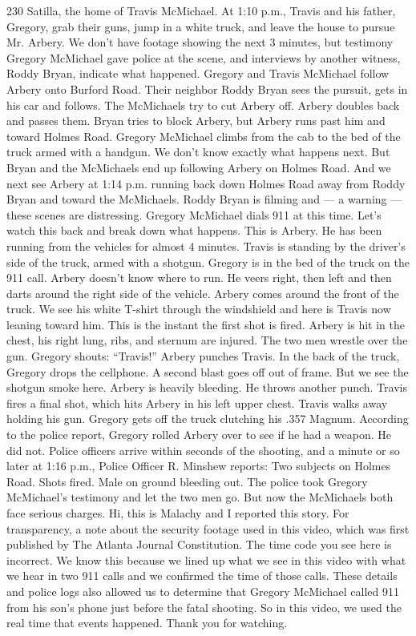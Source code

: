 \begin{itemize}
  230 Satilla, the home of Travis McMichael. At 1:10 p.m., Travis and
  his father, Gregory, grab their guns, jump in a white truck, and leave
  the house to pursue Mr. Arbery. We don't have footage showing the next
  3 minutes, but testimony Gregory McMichael gave police at the scene,
  and interviews by another witness, Roddy Bryan, indicate what
  happened. Gregory and Travis McMichael follow Arbery onto Burford
  Road. Their neighbor Roddy Bryan sees the pursuit, gets in his car and
  follows. The McMichaels try to cut Arbery off. Arbery doubles back and
  passes them. Bryan tries to block Arbery, but Arbery runs past him and
  toward Holmes Road. Gregory McMichael climbs from the cab to the bed
  of the truck armed with a handgun. We don't know exactly what happens
  next. But Bryan and the McMichaels end up following Arbery on Holmes
  Road. And we next see Arbery at 1:14 p.m. running back down Holmes
  Road away from Roddy Bryan and toward the McMichaels. Roddy Bryan is
  filming and --- a warning --- these scenes are distressing. Gregory
  McMichael dials 911 at this time. Let's watch this back and break down
  what happens. This is Arbery. He has been running from the vehicles
  for almost 4 minutes. Travis is standing by the driver's side of the
  truck, armed with a shotgun. Gregory is in the bed of the truck on the
  911 call. Arbery doesn't know where to run. He veers right, then left
  and then darts around the right side of the vehicle. Arbery comes
  around the front of the truck. We see his white T-shirt through the
  windshield and here is Travis now leaning toward him. This is the
  instant the first shot is fired. Arbery is hit in the chest, his right
  lung, ribs, and sternum are injured. The two men wrestle over the gun.
  Gregory shouts: ``Travis!'' Arbery punches Travis. In the back of the
  truck, Gregory drops the cellphone. A second blast goes off out of
  frame. But we see the shotgun smoke here. Arbery is heavily bleeding.
  He throws another punch. Travis fires a final shot, which hits Arbery
  in his left upper chest. Travis walks away holding his gun. Gregory
  gets off the truck clutching his .357 Magnum. According to the police
  report, Gregory rolled Arbery over to see if he had a weapon. He did
  not. Police officers arrive within seconds of the shooting, and a
  minute or so later at 1:16 p.m., Police Officer R. Minshew reports:
  Two subjects on Holmes Road. Shots fired. Male on ground bleeding out.
  The police took Gregory McMichael's testimony and let the two men go.
  But now the McMichaels both face serious charges. Hi, this is Malachy
  and I reported this story. For transparency, a note about the security
  footage used in this video, which was first published by The Atlanta
  Journal Constitution. The time code you see here is incorrect. We know
  this because we lined up what we see in this video with what we hear
  in two 911 calls and we confirmed the time of those calls. These
  details and police logs also allowed us to determine that Gregory
  McMichael called 911 from his son's phone just before the fatal
  shooting. So in this video, we used the real time that events
  happened. Thank you for watching.
\end{itemize}

